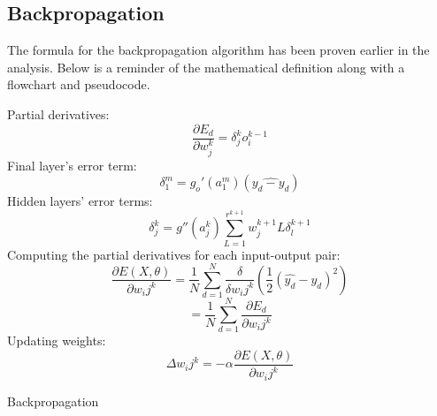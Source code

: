 \documentclass{article}
\begin{document}
\subsection{Backpropagation}
The formula for the backpropagation algorithm has been proven earlier in the analysis. Below is a reminder of the mathematical definition along with a flowchart and pseudocode.

Partial derivatives:
$$\frac{\partial{E_d}}{\partial{w_j^k}} = \delta_j^k o_i^{k-1}$$
Final layer's error term:
$$\delta_1^m = g_o'(a_1^m)(\hat{y_d-y_d})$$
Hidden layers' error terms:
$$\delta_j^k = g''(a_j^k)\sum_{L=1}^{r^{k+1}}w^{k+1}_jL\delta_l^{k+1}$$
Computing the partial derivatives for each input-output pair:
    $$\frac{\partial{E(X,\theta)}}{\partial{w_ij^k}}= \frac{1}{N}\sum_{d=1}^{N}\frac{\delta}{\delta w_ij^k}(\frac{1}{2}(\hat{y_d}-y_d)^2)$$
    $$ = \frac{1}{N}\sum_{d=1}^{N}\frac{\partial{E_d}}{\partial{w_ij^k}}$$
Updating weights:
$$ \Delta w_ij^k = -\alpha \frac{\partial{E(X,\theta)}}{\partial{w_ij^k}}$$
\begin{algorithm}
\caption{Backpropagation}
\begin{algorithmic}[1]
    \Repeat{}
\EndFunction
\end{algorithmic}
\end{algorithm}
\clearpage
\end{document}
